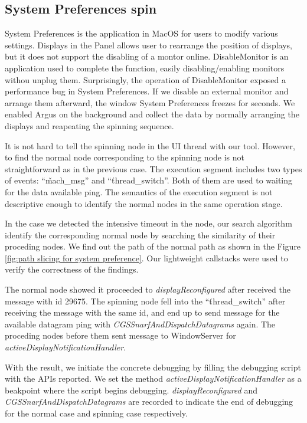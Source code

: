 \subsection{System Preferences spin}
System Preferences is the application in MacOS for users to modify various settings.
Displays in the Panel allows user to rearrange the position of displays, but it does not support the disabling of a montor online.
DisableMonitor is an application used to complete the function, easily disabling/enabling  monitors withou unplug them.
Surprisingly, the operation of DisableMonitor exposed a performance bug in System Preferences.
If we disable an external monitor and arrange them afterward, the window System Preferences freezes for seconds.
We enabled Argus on the background and collect the data by normally arranging the displays and reapeating the spinning sequence.

It is not hard to tell the spinning node in the UI thread with our tool.
However, to find the normal node corresponding to the spinning node is not straightforward as in the previous case.
The execution segment includes two types of events: ``\v{mach\_msg}'' and ``\v{thread\_switch}''.
Both of them are used to waiting for the data available ping.
The semantics of the execution segment is not descriptive enough
to identify the normal nodes in the same operation stage.

In the case we detected the intensive timeout in the node,
our search algorithm identify the corresponding normal node by searching the similarity of their proceding nodes.
We find out the path of the normal path as shown in the Figure \ref{fig:path slicing for system preference}.
Our lightweight callstacks were used to verify the correctness of the findings.

The normal node showed it proceeded to \textit{displayReconfigured} after received the message with id 29675.
The spinning node fell into the ``\v{thread\_switch}'' after receiving the message with the same id,
and end up to send message for the available datagram ping with \textit{CGSSnarfAndDispatchDatagrams} again.
The proceding nodes before them sent message to WindowServer for \textit{activeDisplayNotificationHandler}.

With the result, we initiate the concrete debugging by filling the debugging script with the APIs reported.
We set the method \textit{activeDisplayNotificationHandler} as a beakpoint where the script begins debugging.
\textit{displayReconfigured} and \textit{CGSSnarfAndDispatchDatagrams} are recorded to indicate the end of debugging for the normal case and spinning case respectively.


